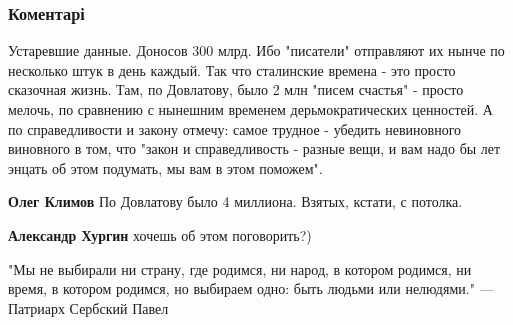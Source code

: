  
 
 
 
 
\subsubsection{Коментарі}

\begin{itemize} %

Устаревшие данные. Доносов 300 млрд. Ибо "писатели" отправляют их нынче по
несколько штук в день каждый. Так что сталинские времена - это просто сказочная
жизнь. Там, по Довлатову, было 2 млн "писем счастья" - просто мелочь, по
сравнению с нынешним временем дерьмократических ценностей. А по справедливости
и закону отмечу: самое трудное - убедить невиновного виновного в том, что
"закон и справедливость - разные вещи, и вам надо бы лет энцать об этом
подумать, мы вам в этом поможем".

\textbf{Олег Климов} По Довлатову было 4 миллиона. Взятых, кстати, с потолка.

\textbf{Александр Хургин} хочешь об этом поговорить?)


"Мы не выбирали ни страну, где родимся, ни народ, в котором родимся, ни время,
в котором родимся, но выбираем одно: быть людьми или нелюдями." — Патриарх
Сербский Павел

\end{itemize} %
